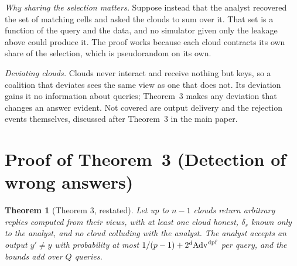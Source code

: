 \documentclass[10pt,journal,compsoc]{IEEEtran}
\newtheorem*{theorem*}{Theorem}
\begin{document}
\emph{Why sharing the selection matters.} Suppose instead that the analyst
recovered the set of matching cells and asked the clouds to sum over it. That
set is a function of the query and the data, and no simulator given only the
leakage above could produce it. The proof works because each cloud contracts
its own share of the selection, which is pseudorandom on its own.

\emph{Deviating clouds.} Clouds never interact and receive nothing but keys,
so a coalition that deviates sees the same view as one that does not. Its
deviation gains it no information about queries; Theorem~3 makes any
deviation that changes an answer evident. Not covered are output delivery and
the rejection events themselves, discussed after Theorem~3 in the main paper.

\section{Proof of Theorem~3 (Detection of wrong answers)}

\begin{theorem*}[Theorem 3, restated]
Let up to $n-1$ clouds return arbitrary replies computed from their views,
with at least one cloud honest, $\delta_s$ known only to the analyst, and no
cloud colluding with the analyst. The analyst accepts an output $y'\neq y$
with probability at most $1/(p-1)+2^d\mathrm{Adv}^{\mathrm{dpf}}$ per query, and the bounds add
over $Q$ queries.
\end{theorem*}
\end{document}
